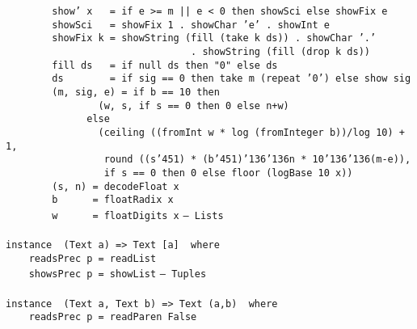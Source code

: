 \mbox{\tt \ \ \ \ \ \ \ \ show'\ x\ \ \ =\ if\ e\ >=\ m\ ||\ e\ <\ 0\ then\ showSci\ else\ showFix\ e}\\
\mbox{\tt \ \ \ \ \ \ \ \ showSci\ \ \ =\ showFix\ 1\ .\ showChar\ 'e'\ .\ showInt\ e}\\
\mbox{\tt \ \ \ \ \ \ \ \ showFix\ k\ =\ showString\ (fill\ (take\ k\ ds))\ .\ showChar\ '.'}\\
\mbox{\tt \ \ \ \ \ \ \ \ \ \ \ \ \ \ \ \ \ \ \ \ \ \ \ \ \ \ \ \ \ \ \ \ .\ showString\ (fill\ (drop\ k\ ds))}\\
\mbox{\tt \ \ \ \ \ \ \ \ fill\ ds\ \ \ =\ if\ null\ ds\ then\ "0"\ else\ ds}\\
\mbox{\tt \ \ \ \ \ \ \ \ ds\ \ \ \ \ \ \ \ =\ if\ sig\ ==\ 0\ then\ take\ m\ (repeat\ '0')\ else\ show\ sig}\\
\mbox{\tt \ \ \ \ \ \ \ \ (m,\ sig,\ e)\ =\ if\ b\ ==\ 10\ then}\\
\mbox{\tt \ \ \ \ \ \ \ \ \ \ \ \ \ \ \ \ (w,\ s,\ if\ s\ ==\ 0\ then\ 0\ else\ n+w)}\\
\mbox{\tt \ \ \ \ \ \ \ \ \ \ \ \ \ \ else}\\
\mbox{\tt \ \ \ \ \ \ \ \ \ \ \ \ \ \ \ \ (ceiling\ ((fromInt\ w\ *\ log\ (fromInteger\ b))/log\ 10)\ +\ 1,}\\
\mbox{\tt \ \ \ \ \ \ \ \ \ \ \ \ \ \ \ \ \ round\ ((s{\char'45}1)\ *\ (b{\char'45}1){\char'136}{\char'136}n\ *\ 10{\char'136}{\char'136}(m-e)),}\\
\mbox{\tt \ \ \ \ \ \ \ \ \ \ \ \ \ \ \ \ \ if\ s\ ==\ 0\ then\ 0\ else\ floor\ (logBase\ 10\ x))}\\
\mbox{\tt \ \ \ \ \ \ \ \ (s,\ n)\ =\ decodeFloat\ x}\\
\mbox{\tt \ \ \ \ \ \ \ \ b\ \ \ \ \ \ =\ floatRadix\ x}\\
\mbox{\tt \ \ \ \ \ \ \ \ w\ \ \ \ \ \ =\ floatDigits\ x}
\eprogB\noindent\bprogB
\mbox{\tt --\ Lists}\\
\mbox{\tt }\\
\mbox{\tt instance\ \ (Text\ a)\ =>\ Text\ [a]\ \ where}\\
\mbox{\tt \ \ \ \ readsPrec\ p\ =\ readList}\\
\mbox{\tt \ \ \ \ showsPrec\ p\ =\ showList}
\eprogB\noindent\bprogB
\mbox{\tt --\ Tuples}\\
\mbox{\tt }\\
\mbox{\tt instance\ \ (Text\ a,\ Text\ b)\ =>\ Text\ (a,b)\ \ where}\\
\mbox{\tt \ \ \ \ readsPrec\ p\ =\ readParen\ False}\\
